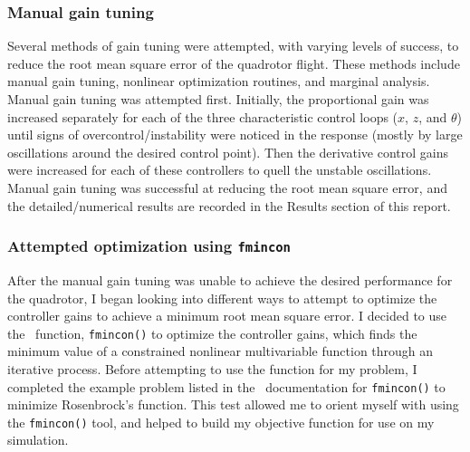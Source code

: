 \subsubsection{Manual gain tuning}
Several methods of gain tuning were attempted, with varying levels of success, to reduce the root mean square error of the quadrotor flight. These methods include manual gain tuning, nonlinear optimization routines, and marginal analysis. Manual gain tuning was attempted first. Initially, the proportional gain was increased separately for each of the three characteristic control loops ($x$, $z$, and $\theta$) until signs of overcontrol/instability were noticed in the response (mostly by large oscillations around the desired control point). Then the derivative control gains were increased for each of these controllers to quell the unstable oscillations. Manual gain tuning was successful at reducing the root mean square error, and the detailed/numerical results are recorded in the Results section of this report.

\subsubsection{Attempted optimization using \lstinline{fmincon}} 
After the manual gain tuning was unable to achieve the desired performance for the quadrotor, I began looking into different ways to attempt to optimize the controller gains to achieve a minimum root mean square error. I decided to use the \MATLAB\ function, \lstinline{fmincon()} to optimize the controller gains, which finds the minimum value of a constrained nonlinear multivariable function through an iterative process. Before attempting to use the function for my problem, I completed the example problem listed in the \MATLAB\ documentation for \lstinline{fmincon()} to minimize Rosenbrock's function. This test allowed me to orient myself with using the \lstinline{fmincon()} tool, and helped to build my objective function for use on my simulation. 

